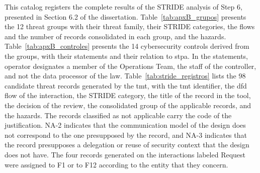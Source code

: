 \label{apx:stride}

This catalog registers the complete results of the STRIDE analysis of Step 6, presented in Section 6.2 of the dissertation. Table~\ref{tab:apxB_grupos} presents the 12 threat groups with their threat family, their STRIDE categories, the flows and the number of records consolidated in each group, and the hazards. Table~\ref{tab:apxB_controles} presents the 14 cybersecurity controls derived from the groups, with their statements and their relation to \gls{stpa}. In the statements, operator designates a member of the Operations Team, the staff of the controller, and not the data processor of the law. Table~\ref{tab:stride_registros} lists the 98 candidate threat records generated by the \gls{tmt}, with the \gls{tmt} identifier, the \gls{dfd} flow of the interaction, the STRIDE category, the title of the record in the tool, the decision of the review, the consolidated group of the applicable records, and the hazards. The records classified as not applicable carry the code of the justification. NA-2 indicates that the communication model of the design does not correspond to the one presupposed by the record, and NA-3 indicates that the record presupposes a delegation or reuse of security context that the design does not have. The four records generated on the interactions labeled Request were assigned to F1 or to F12 according to the entity that they concern.


